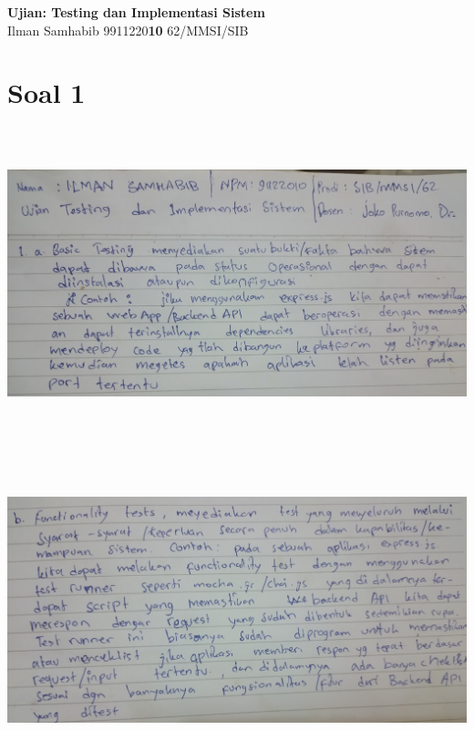 \documentclass[12pt]{article}
\begin{document}
\begin{center}
   \textbf{Ujian: Testing dan Implementasi Sistem}
   \\Ilman Samhabib 9911220\textbf{10} 62/MMSI/SIB

\end{center}

\section*{Soal 1}

\begin{center}
   \includegraphics[width=17cm, height=9cm]{images/part-1.jpg}
\end{center}
\begin{center}
   \includegraphics[width=17cm, height=9cm]{images/part-2.jpg}
\end{center}
\end{document}
